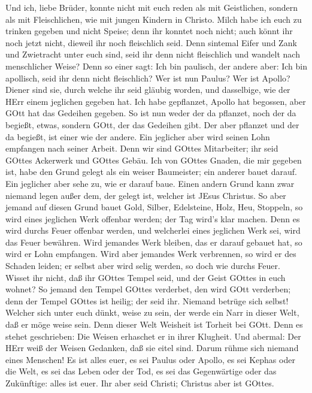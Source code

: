  Und ich, liebe Brüder, konnte nicht mit euch reden als mit
Geistlichen, sondern als mit Fleischlichen, wie mit jungen Kindern in
Christo.  Milch habe ich euch zu trinken gegeben und nicht
Speise; denn ihr konntet noch nicht; auch könnt ihr noch jetzt nicht,
 dieweil ihr noch fleischlich seid. Denn sintemal Eifer und
Zank und Zwietracht unter euch sind, seid ihr denn nicht fleischlich und
wandelt nach menschlicher Weise?  Denn so einer sagt: Ich
bin paulisch, der andere aber: Ich bin apollisch, seid ihr denn nicht
fleischlich?  Wer ist nun Paulus? Wer ist Apollo? Diener
sind sie, durch welche ihr seid gläubig worden, und dasselbige, wie der
HErr einem jeglichen gegeben hat.  Ich habe gepflanzet,
Apollo hat begossen, aber GOtt hat das Gedeihen gegeben.  So
ist nun weder der da pflanzet, noch der da begießt, etwas, sondern GOtt,
der das Gedeihen gibt.  Der aber pflanzet und der da
begießt, ist einer wie der andere. Ein jeglicher aber wird seinen Lohn
empfangen nach seiner Arbeit.  Denn wir sind GOttes
Mitarbeiter; ihr seid GOttes Ackerwerk und GOttes Gebäu. 
Ich von GOttes Gnaden, die mir gegeben ist, habe den Grund gelegt als
ein weiser Baumeister; ein anderer bauet darauf. Ein jeglicher aber sehe
zu, wie er darauf baue.  Einen andern Grund kann zwar
niemand legen außer dem, der gelegt ist, welcher ist JEsus Christus.
 So aber jemand auf diesen Grund bauet Gold, Silber,
Edelsteine, Holz, Heu, Stoppeln,  so wird eines jeglichen
Werk offenbar werden; der Tag wird's klar machen. Denn es wird durchs
Feuer offenbar werden, und welcherlei eines jeglichen Werk sei, wird das
Feuer bewähren.  Wird jemandes Werk bleiben, das er darauf
gebauet hat, so wird er Lohn empfangen.  Wird aber jemandes
Werk verbrennen, so wird er des Schaden leiden; er selbst aber wird
selig werden, so doch wie durchs Feuer.  Wisset ihr nicht,
daß ihr GOttes Tempel seid, und der Geist GOttes in euch wohnet?
 So jemand den Tempel GOttes verderbet, den wird GOtt
verderben; denn der Tempel GOttes ist heilig; der seid ihr.
 Niemand betrüge sich selbst! Welcher sich unter euch
dünkt, weise zu sein, der werde ein Narr in dieser Welt, daß er möge
weise sein.  Denn dieser Welt Weisheit ist Torheit bei
GOtt. Denn es stehet geschrieben: Die Weisen erhaschet er in ihrer
Klugheit.  Und abermal: Der HErr weiß der Weisen Gedanken,
daß sie eitel sind.  Darum rühme sich niemand eines
Menschen! Es ist alles euer,  es sei Paulus oder Apollo, es
sei Kephas oder die Welt, es sei das Leben oder der Tod, es sei das
Gegenwärtige oder das Zukünftige: alles ist euer.  Ihr aber
seid Christi; Christus aber ist GOttes.

